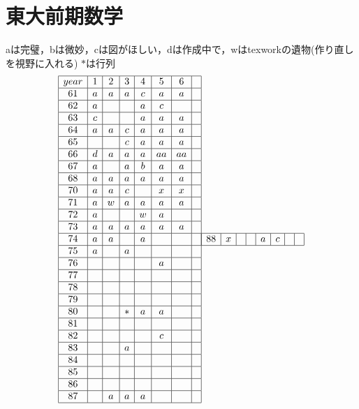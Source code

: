 \documentclass[a4j]{jarticle}
\title{}
\begin{document}

\section{東大前期数学}
aは完璧，bは微妙，cは図がほしい，dは作成中で，wはtexworkの遺物(作り直しを視野に入れる)
$*$は行列
     \begin{align*}
          \begin{array}{|c|c|c|c|c|c|c|c|} \hline
          year&1&2&3&4&5&6& \\ \hline
          61&a&a&a&c&a&a& \\ \hline
          62&a&&&a&c&& \\ \hline
          63&c&&&a&a&a& \\ \hline
          64&a&a&c&a&a&a& \\ \hline
          65&&&c&a&a&a& \\ \hline
          66&d&a&a&a&aa&aa& \\ \hline
          67&a&&a&b&a&a& \\ \hline
          68&a&a&a&a&a&a& \\ \hline
          70&a&a&c&&x&x& \\ \hline
          71&a&w&a&a&a&a& \\ \hline
          72&a&&&w&a&& \\ \hline
          73&a&a&a&a&a&a& \\ \hline
          74&a&a&&a&&& \\ \hline
          75&a&&a&&&& \\ \hline
          76&&&&&a&& \\ \hline
          77&&&&&&& \\ \hline
          78&&&&&&& \\ \hline
          79&&&&&&& \\ \hline
          80&&&*&a&a&& \\ \hline
          81&&&&&&& \\ \hline
          82&&&&&c&& \\ \hline
          83&&&a&&&& \\ \hline
          84&&&&&&& \\ \hline
          85&&&&&&& \\ \hline
          86&&&&&&& \\ \hline
          87&&a&a&a&&& \\ \hline
          \end{array}
          \begin{array}{|c|c|c|c|c|c|c|c|} \hline
          88&x&&&a&c&& \\ \hline

\end{array}
\end{align*}
\end{document}
